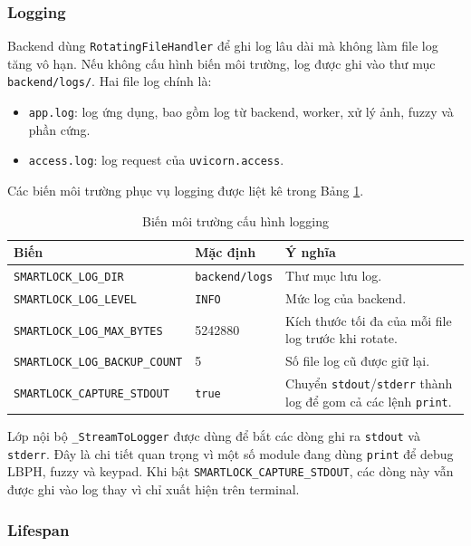 \subsubsection{Logging}

Backend dùng \texttt{RotatingFileHandler} để ghi log lâu dài mà không làm file log tăng vô hạn. Nếu không cấu hình biến môi trường, log được ghi vào thư mục \texttt{backend/logs/}. Hai file log chính là:

\begin{itemize}
    \item \texttt{app.log}: log ứng dụng, bao gồm log từ backend, worker, xử lý ảnh, fuzzy và phần cứng.
    \item \texttt{access.log}: log request của \texttt{uvicorn.access}.
\end{itemize}

Các biến môi trường phục vụ logging được liệt kê trong Bảng \ref{tab:logging_env}.

\begin{table}[H]
\centering
\caption{Biến môi trường cấu hình logging}
\label{tab:logging_env}
\begin{tabularx}{\textwidth}{|l|l|X|}
\hline
\textbf{Biến} & \textbf{Mặc định} & \textbf{Ý nghĩa} \\
\hline
\texttt{SMARTLOCK\_LOG\_DIR} & \texttt{backend/logs} & Thư mục lưu log. \\
\hline
\texttt{SMARTLOCK\_LOG\_LEVEL} & \texttt{INFO} & Mức log của backend. \\
\hline
\texttt{SMARTLOCK\_LOG\_MAX\_BYTES} & 5242880 & Kích thước tối đa của mỗi file log trước khi rotate. \\
\hline
\texttt{SMARTLOCK\_LOG\_BACKUP\_COUNT} & 5 & Số file log cũ được giữ lại. \\
\hline
\texttt{SMARTLOCK\_CAPTURE\_STDOUT} & \texttt{true} & Chuyển \texttt{stdout}/\texttt{stderr} thành log để gom cả các lệnh \texttt{print}. \\
\hline
\end{tabularx}
\end{table}

Lớp nội bộ \texttt{\_StreamToLogger} được dùng để bắt các dòng ghi ra \texttt{stdout} và \texttt{stderr}. Đây là chi tiết quan trọng vì một số module đang dùng \texttt{print} để debug LBPH, fuzzy và keypad. Khi bật \texttt{SMARTLOCK\_CAPTURE\_STDOUT}, các dòng này vẫn được ghi vào log thay vì chỉ xuất hiện trên terminal.

\subsubsection{Lifespan}

